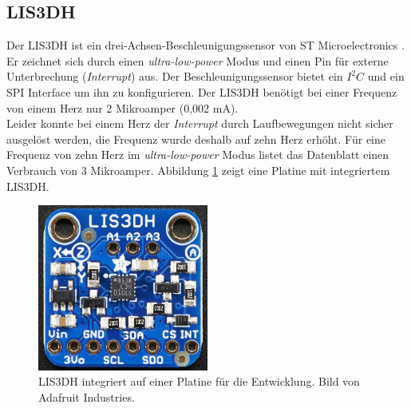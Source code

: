 \subsection{LIS3DH}
Der LIS3DH ist ein drei-Achsen-Beschleunigungssensor von ST Microelectronics \cite{st2015lis}.
Er zeichnet sich durch einen \emph{ultra-low-power} Modus und einen Pin für externe Unterbrechung (\emph{Interrupt}) aus.
Der Beschleunigungssensor bietet ein $I^2C$ und ein SPI Interface um ihn zu konfigurieren.
Der LIS3DH benötigt bei einer Frequenz von einem Herz nur 2 Mikroamper (0,002 mA).\\
Leider konnte bei einem Herz der \emph{Interrupt} durch Laufbewegungen nicht sicher ausgelöst werden, die Frequenz wurde deshalb auf zehn Herz erhöht.
Für eine Frequenz von zehn Herz im \emph{ultra-low-power} Modus listet das Datenblatt einen Verbrauch von 3 Mikroamper.
Abbildung \ref{fig:lis3dh} zeigt eine Platine mit integriertem LIS3DH.

\begin{figure}[h]
  \centering
	\includegraphics[width=0.5\textwidth]{images/lis3dhada.png}
  \caption{LIS3DH integriert auf einer Platine für die Entwicklung. Bild von Adafruit Industries.}
  \label{fig:lis3dh}
\end{figure}

